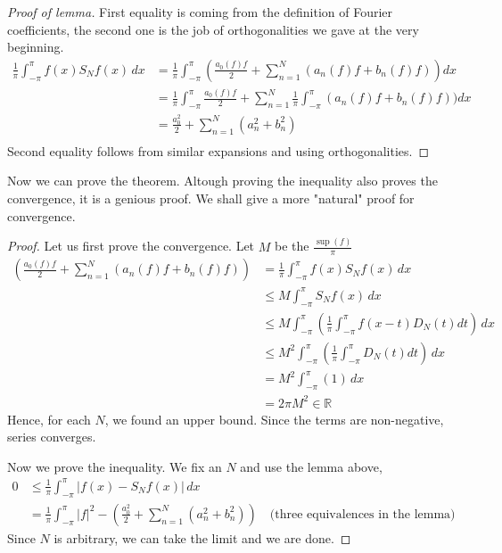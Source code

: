 \documentclass[12pt]{amsart}
\theoremstyle{definition}
\begin{document}
 \begin{proof}[Proof of lemma]
 First equality is coming from the definition of Fourier coefficients, the second one is the job of orthogonalities we gave at the very beginning.
 \[
 \begin{aligned}
     \frac{1}{\pi} \int_{-\pi}^{\pi} f(x)S_Nf(x) \, dx
         &= \frac{1}{\pi} \int_{-\pi}^{\pi} (\frac{a_0(f)f}{2} + \sum_{n=1}^{N} \left(a_n(f)f +
         b_n(f)f\right))dx \\
         &= \frac{1}{\pi} \int_{-\pi}^{\pi}\frac{a_0(f)f}{2} + \sum_{n=1}^{N} \frac{1}{\pi} \int_{-\pi}^{\pi} \left(a_n(f)f +
         b_n(f)f\right))dx \\
         &= \frac{a_0^2}{2} + \sum_{n=1}^{N} \left(a_n^2 +
         b_n^2\right)\\
 \end{aligned}
 \]
 Second equality follows from similar expansions and using orthogonalities.

 \end{proof}


    Now we can prove the theorem. Altough proving the inequality also proves the convergence, it is a genious proof. We shall give a more "natural" proof for convergence.


    \begin{proof}
        Let us first prove the convergence. Let $M$ be the $\frac{\sup(f)}{\pi}$
        \[
        \begin{aligned}
            (\frac{a_0(f)f}{2} + \sum_{n=1}^{N} \left(a_n(f)f +
         b_n(f)f\right))
         &=  \frac{1}{\pi} \int_{-\pi}^{\pi} f(x)S_Nf(x) \, dx \\
         &\leq M \int_{-\pi}^{\pi}S_Nf(x) \, dx \\
         &\leq M \int_{-\pi}^{\pi}(\frac{1}{\pi} \int_{-\pi}^{\pi}f(x-t)D_N(t)dt) \, dx \\
         &\leq M^2  \int_{-\pi}^{\pi}(\frac{1}{\pi} \int_{-\pi}^{\pi}D_N(t)dt) \, dx \\
         &= M^2  \int_{-\pi}^{\pi}(1) \, dx \\
         &= 2\pi M^2 \in \mathbb{R}
        \end{aligned}
        \]
        Hence, for each $N$, we found an upper bound. Since the terms are non-negative, series converges.

        Now we prove the inequality.
        We fix an $N$ and use the lemma above,
        \[
        \begin{aligned}
            0
            &\leq \frac{1}{\pi} \int_{-\pi}^{\pi} |f(x)-S_Nf(x)| \, dx \\
            &= \frac{1}{\pi} \int_{-\pi}^{\pi}|f|^2 - \left( \frac{a_0^2}{2} + \sum_{n=1}^{N} \left(a_n^2 + b_n^2\right) \right) \quad \text{(three equivalences in the lemma)}
        \end{aligned}
        \]
        Since $N$ is arbitrary, we can take the limit and we are done.
    \end{proof}
\end{document}
